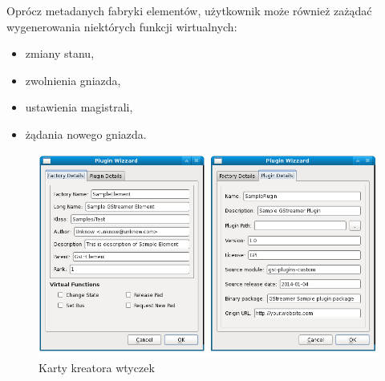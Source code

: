 \documentclass[12pt]{article}
\begin{document}
\noindent
Oprócz metadanych fabryki elementów, użytkownik może również zażądać wygenerowania niektórych funkcji wirtualnych:
\begin{itemize}
  \setlength{\itemsep}{0em}
\item zmiany stanu,
\item zwolnienia gniazda,
\item ustawienia magistrali,
\item żądania nowego gniazda.
\end{itemize}
\begin{figure}[H]
  \includegraphics[width=160mm]{img/plugin-wizzard.png}
  \caption{Karty kreatora wtyczek}
  \label{fig:pluginWizzard}
\end{figure}
\end{document}
